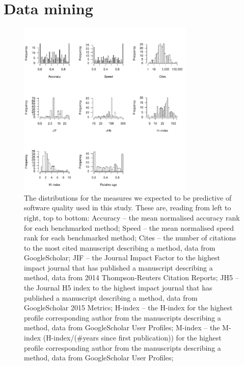 \documentclass[fleqn,10pt]{SelfArx} %
\begin{document}





\clearpage
\newpage

\section*{Data mining} %

\begin{figure}[H]
\centering
\includegraphics[width=0.75\textwidth]{supplementary-figures-small.pdf}
\caption{The distributions for the measures we expected to be
  predictive of software quality used in this study. These
are, reading from left to right, top to bottom: Accuracy -- the mean
normalised accuracy rank for each benchmarked method; Speed -- the
mean normalised speed rank for each benchmarked method; Cites -- the number of
citations to the most cited manuscript describing a method, data from GoogleScholar;
JIF -- the Journal Impact Factor to the highest impact journal that has published
a manuscript describing a method, data from 2014 Thompson-Reuters Citation Reports;
JH5 -- the Journal H5 index to the highest impact journal that has published
a manuscript describing a method, data from GoogleScholar 2015 Metrics;
H-index -- the H-index for the highest profile corresponding author from the
manuscripts describing a method, data from GoogleScholar User Profiles;
M-index -- the M-index (H-index/(\#years since first publication)) for the
highest profile corresponding author from the manuscripts describing a method,
data from GoogleScholar User Profiles;}
\label{fig:metricDistributions}
\end{figure}
\end{document}
